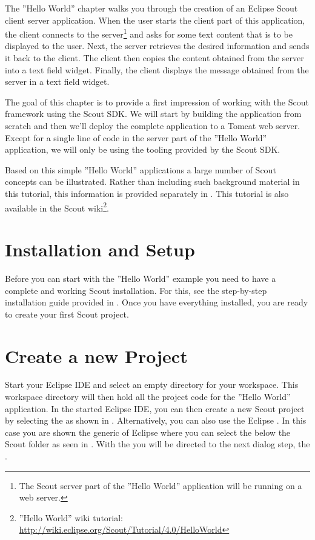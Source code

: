 \documentclass[a4paper,10pt,twoside]{book}
\begin{document}
The ''Hello World'' chapter walks you through the creation of an Eclipse Scout client server application.
When the user starts the client part of this application, the client connects to the server\footnote{
The Scout server part of the ''Hello World'' application will be running on a web server.
} 
and asks for some text content that is to be displayed to the user.
Next, the server retrieves the desired information and sends it back to the client.
The client then copies the content obtained from the server into a text field widget.
Finally, the client displays the message obtained from the server in a text field widget.

The goal of this chapter is to provide a first impression of working with the Scout framework using the Scout SDK.
We will start by building the application from scratch and then we'll deploy the complete application to a Tomcat web server.
Except for a single line of code in the server part of the ''Hello World'' application, we will only be using the tooling provided by the Scout SDK.

Based on this simple ''Hello World'' applications a large number of Scout concepts can be illustrated.
Rather than including such background material in this tutorial, this information is provided separately in .
This tutorial is also available in the Scout wiki\footnote{
''Hello World'' wiki tutorial: \url{http://wiki.eclipse.org/Scout/Tutorial/4.0/HelloWorld}
}.

\section{Installation and Setup}

Before you can start with the ''Hello World'' example you need to have a complete and working Scout installation.
For this, see the step-by-step installation guide provided in .
Once you have everything installed, you are ready to create your first Scout project.

\section{Create a new Project}

Start your Eclipse IDE and select an empty directory for your workspace.
This workspace directory will then hold all the project code for the ''Hello World'' application.
In the started Eclipse IDE, you can then create a new Scout project by selecting the  as shown in .
Alternatively, you can also use the Eclipse .
In this case you are shown the generic  of Eclipse where you can select the  below the Scout folder as seen in .
With the  you will be directed to the next dialog step, the .
\end{document}
